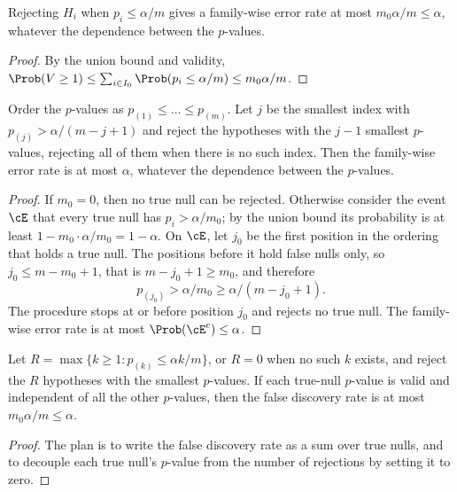 \begin{refsection}
\begin{proposition}[Bonferroni]\label{thm:toolkit:bonferroni}
Rejecting $H_i$ when $p_i\le\alpha/m$ gives a family-wise error rate at most $m_0\alpha/m\le\alpha$, whatever the dependence between the $p$-values.
\end{proposition}

\begin{proof}
By the union bound and validity, $\Prob(V\ge1)\le\sum_{i\in I_0}\Prob(p_i\le\alpha/m)\le m_0\alpha/m$.
\end{proof}

\begin{theorem}\label{thm:toolkit:holm}
Order the $p$-values as $p_{(1)}\le\dots\le p_{(m)}$. Let $j$ be the smallest index with $p_{(j)}>\alpha/(m-j+1)$ and reject the hypotheses with the $j-1$ smallest $p$-values, rejecting all of them when there is no such index. Then the family-wise error rate is at most $\alpha$, whatever the dependence between the $p$-values.
\end{theorem}

\begin{proof}
If $m_0=0$, then no true null can be rejected. Otherwise consider the event $\cE$ that every true null has $p_i>\alpha/m_0$; by the union bound its probability is at least $1-m_0\cdot\alpha/m_0=1-\alpha$. On $\cE$, let $j_0$ be the first position in the ordering that holds a true null. The positions before it hold false nulls only, so $j_0\le m-m_0+1$, that is $m-j_0+1\ge m_0$, and therefore
\[
p_{(j_0)}>\alpha/m_0\ge\alpha/(m-j_0+1).
\]
The procedure stops at or before position $j_0$ and rejects no true null. The family-wise error rate is at most $\Prob(\cE^c)\le\alpha$.
\end{proof}

\begin{theorem}\label{thm:toolkit:bh}
Let $R=\max\{k\ge1:p_{(k)}\le\alpha k/m\}$, or $R=0$ when no such $k$ exists, and reject the $R$ hypotheses with the smallest $p$-values. If each true-null $p$-value is valid and independent of all the other $p$-values, then the false discovery rate is at most $m_0\alpha/m\le\alpha$.
\end{theorem}

\begin{proof}
The plan is to write the false discovery rate as a sum over true nulls, and to decouple each true null's $p$-value from the number of rejections by setting it to zero.


\end{proof}
\end{refsection}
